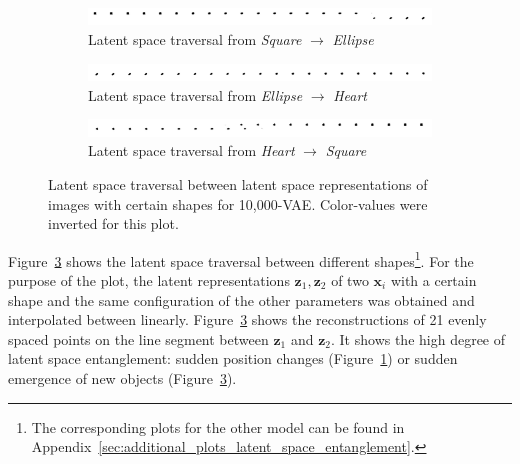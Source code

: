 \begin{figure}
    \centering
    \begin{subfigure}{\textwidth}
        \centering
        \includegraphics[width=\textwidth]{images/latent_space_entanglement/vae_10000_traverse_square_ellipse.png}
        \caption{Latent space traversal from \textit{Square} $\rightarrow$ \textit{Ellipse}}
        \label{subfig:10000_vae_latent_space_traversal_square_to_ellipse}
    \end{subfigure}
    \begin{subfigure}{\textwidth}
        \centering
        \includegraphics[width=\textwidth]{images/latent_space_entanglement/vae_10000_traverse_ellipse_heart.png}
        \caption{Latent space traversal from \textit{Ellipse} $\rightarrow$ \textit{Heart}}
    \end{subfigure}
    \begin{subfigure}{\textwidth}
        \centering
        \includegraphics[width=\textwidth]{images/latent_space_entanglement/vae_10000_traverse_heart_square.png}
        \caption{Latent space traversal from \textit{Heart} $\rightarrow$ \textit{Square}}
        \label{subfig:10000_vae_latent_space_traversal_heart_to_square}
    \end{subfigure}
    \caption[VAE Latent Space Traversal - dsprites]{Latent space traversal between latent space representations of images with certain shapes for 10,000-\ac{VAE}. Color-values were inverted for this plot.}
    \label{fig:10000_vae_latent_space_traversal_shape_to_shape}
\end{figure}

Figure~\ref{fig:10000_vae_latent_space_traversal_shape_to_shape} shows the latent space traversal between different shapes\footnote{The corresponding plots for the other model can be found in Appendix~\ref{sec:additional_plots_latent_space_entanglement}.}.
For the purpose of the plot, the latent representations $\bm{z}_1, \bm{z}_2$ of two $\bm{x}_i$ with a certain shape and the same configuration of the other parameters was obtained and interpolated between linearly.
Figure~\ref{fig:10000_vae_latent_space_traversal_shape_to_shape} shows the reconstructions of 21 evenly spaced points on the line segment between $\bm{z}_1$ and $\bm{z}_2$.
It shows the high degree of latent space entanglement: sudden position changes (Figure~\ref{subfig:10000_vae_latent_space_traversal_square_to_ellipse}) or sudden emergence of new objects (Figure~\ref{fig:10000_vae_latent_space_traversal_shape_to_shape}).

